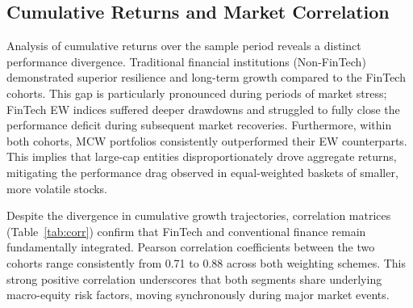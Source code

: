 \documentclass[12pt]{article}
\begin{document}
\subsection{Cumulative Returns and Market Correlation}
Analysis of cumulative returns over the sample period reveals a distinct performance divergence. Traditional financial institutions (Non-FinTech) demonstrated superior resilience and long-term growth compared to the FinTech cohorts. This gap is particularly pronounced during periods of market stress; FinTech EW indices suffered deeper drawdowns and struggled to fully close the performance deficit during subsequent market recoveries. Furthermore, within both cohorts, MCW portfolios consistently outperformed their EW counterparts. This implies that large-cap entities disproportionately drove aggregate returns, mitigating the performance drag observed in equal-weighted baskets of smaller, more volatile stocks.

Despite the divergence in cumulative growth trajectories, correlation matrices (Table~\ref{tab:corr}) confirm that FinTech and conventional finance remain fundamentally integrated. Pearson correlation coefficients between the two cohorts range consistently from 0.71 to 0.88 across both weighting schemes. This strong positive correlation underscores that both segments share underlying macro-equity risk factors, moving synchronously during major market events.
\end{document}
